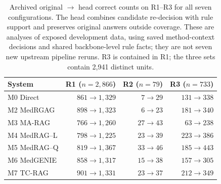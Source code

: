 \begin{table}[tb]
\centering
\small
\caption{Archived original $\rightarrow$ head correct counts on R1--R3 for all seven configurations. The head combines candidate re-decision with rule support and preserves original answers outside coverage. These are analyses of exposed development data, using saved method-context decisions and shared backbone-level rule facts; they are not seven new upstream pipeline reruns. R3 is contained in R1; the three sets contain 2,941 distinct units.}
\label{tab:seven-heads}
\begin{tabular*}{\linewidth}{@{\extracolsep{\fill}}lrrr@{}}
\toprule
System & R1 ($n=2{,}866$) & R2 ($n=79$) & R3 ($n=733$) \\
\midrule
M0 Direct & $861 \rightarrow 1,329$ & $7 \rightarrow 29$ & $131 \rightarrow 338$ \\
M2 MedRGAG & $898 \rightarrow 1,323$ & $6 \rightarrow 23$ & $181 \rightarrow 340$ \\
M3 MA-RAG & $766 \rightarrow 1,260$ & $27 \rightarrow 43$ & $63 \rightarrow 238$ \\
M4 MedRAG--L & $798 \rightarrow 1,225$ & $23 \rightarrow 39$ & $223 \rightarrow 386$ \\
M5 MedRAG--Q & $819 \rightarrow 1,367$ & $33 \rightarrow 46$ & $185 \rightarrow 443$ \\
M6 MedGENIE & $858 \rightarrow 1,317$ & $15 \rightarrow 38$ & $157 \rightarrow 305$ \\
M7 TC-RAG & $901 \rightarrow 1,331$ & $23 \rightarrow 37$ & $212 \rightarrow 349$ \\
\bottomrule
\end{tabular*}
\end{table}
